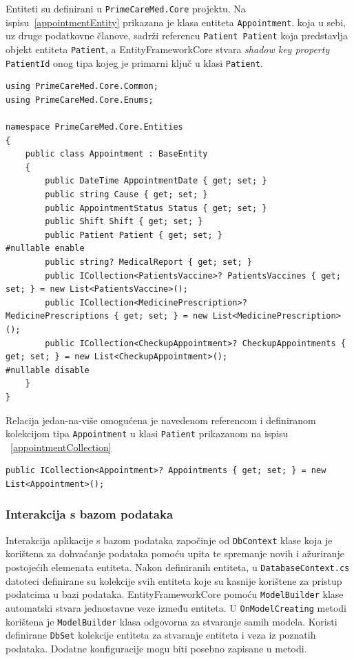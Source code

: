 Entiteti su definirani u \texttt{PrimeCareMed.Core} projektu.
Na ispisu~\ref{appointmentEntity} prikazana je klasa entiteta \texttt{Appointment}. koja u sebi, uz druge podatkovne članove, sadrži referencu \texttt{Patient Patient} koja predstavlja objekt entiteta \texttt{Patient}, a EntityFrameworkCore stvara \textit{shadow key property} \texttt{PatientId} onog tipa kojeg je primarni ključ u klasi \texttt{Patient}. 
\begin{lstlisting}[caption={Entitet Appointment}, label=appointmentEntity]
using PrimeCareMed.Core.Common;
using PrimeCareMed.Core.Enums;

namespace PrimeCareMed.Core.Entities
{
    public class Appointment : BaseEntity
    {
        public DateTime AppointmentDate { get; set; }
        public string Cause { get; set; }
        public AppointmentStatus Status { get; set; }
        public Shift Shift { get; set; }
        public Patient Patient { get; set; }
#nullable enable
        public string? MedicalReport { get; set; }
        public ICollection<PatientsVaccine>? PatientsVaccines { get; set; } = new List<PatientsVaccine>();
        public ICollection<MedicinePrescription>? MedicinePrescriptions { get; set; } = new List<MedicinePrescription>();
        public ICollection<CheckupAppointment>? CheckupAppointments { get; set; } = new List<CheckupAppointment>();
#nullable disable
    }
}
\end{lstlisting}
Relacija jedan-na-više\cite{oneToMany} omogućena je navedenom referencom i definiranom kolekcijom tipa \texttt{Appointment} u klasi \texttt{Patient} prikazanom na ispisu ~\ref{appointmentCollection}
\begin{lstlisting}[caption={Kolekcija Appointment objekata u klasi Patient}, label=appointmentCollection]
public ICollection<Appointment>? Appointments { get; set; } = new List<Appointment>();
\end{lstlisting}

\subsubsection{Interakcija s bazom podataka}
Interakcija aplikacije s bazom podataka započinje od \texttt{DbContext} klase koja je korištena za dohvaćanje podataka pomoću upita te spremanje novih i ažuriranje postojećih elemenata entiteta. Nakon definiranih entiteta, u \texttt{DatabaseContext.cs} datoteci definirane su kolekcije svih entiteta koje su kasnije korištene za pristup podatcima u bazi podataka. EntityFrameworkCore pomoću \texttt{ModelBuilder} klase automatski stvara jednostavne veze između entiteta. U \texttt{OnModelCreating} metodi korištena je \texttt{ModelBuilder} klasa odgovorna za stvaranje samih modela. Koristi definirane \texttt{DbSet} kolekcije entiteta za stvaranje entiteta i veza iz poznatih podataka. Dodatne konfiguracije mogu biti posebno zapisane u metodi.

